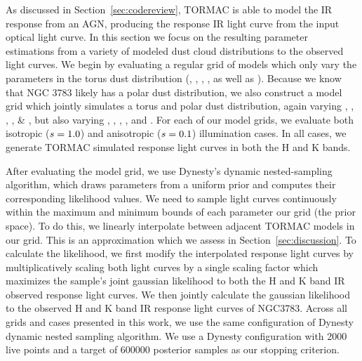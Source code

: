 \par As discussed in Section~\ref{sec:codereview}, TORMAC is able to model the IR response from an AGN, producing the response IR light curve from the input optical light curve. In this section we focus on the resulting parameter estimations from a variety of modeled dust cloud distributions to the observed light curves. We begin by evaluating a regular grid  of models which only vary the parameters in the torus dust distribution (\Y, \sig, \p, \vff, as well as \inc). Because we know that NGC 3783 likely has a polar dust distribution, we also construct a model grid which jointly simulates a torus and polar dust distribution, again varying \Y, \sig, \p, \vff, \& \inc, but also varying \Ypol, \sigpol, \ppol, \vffpol, and \open. For each of our model grids, we evaluate both isotropic ($s = 1.0$) and anisotropic ($s = 0.1$) illumination cases. In all cases, we generate TORMAC simulated response light curves in both the H and K bands.


\par After evaluating the model grid, we use Dynesty's dynamic nested-sampling algorithm, which draws parameters from a uniform prior and computes their corresponding likelihood values. We need to sample light curves continuously within the maximum and minimum bounds of each parameter our grid (the prior space). To do this, we linearly interpolate between adjacent TORMAC models in our grid. This is an approximation which we assess in Section~\ref{sec:discussion}. To calculate the likelihood, we first modify the interpolated response light curves by multiplicatively scaling both light curves by a single scaling factor which maximizes the sample's joint gaussian likelihood to both the H and K band IR observed response light curves. We then jointly calculate the gaussian likelihood to the observed H and K band IR response light curves of NGC3783. Across all grids and cases presented in this work, we use the same configuration of Dynesty dynamic nested sampling algorithm. We use a Dynesty configuration with 2000 live points and a target of 600000 posterior samples as our stopping criterion. 


